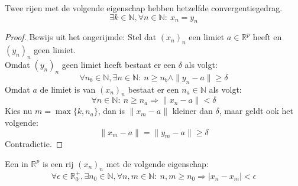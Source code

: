 \documentclass[main.tex]{subfiles}
\begin{document}
\begin{pr}
  Twee rijen met de volgende eigenschap hebben hetzelfde convergentiegedrag.
  \[ \exists k\in \mathbb{N}, \forall n \in \mathbb{N}:\ x_{n} = y_{n} \]

  \begin{proof}
    Bewijs uit het ongerijmde: Stel dat $(x_{n})_{n}$ een limiet $a\in\mathbb{R}^{p}$ heeft en $(y_{n})_{n}$ geen limiet.\\
    Omdat $(y_{n})_{n}$ geen limiet heeft bestaat er een $\delta$ als volgt:
    \[ \forall n_{b}\in \mathbb{N},\exists n\in \mathbb{N}:\ n \ge n_{b} \wedge\|y_{n}-a\| \ge \delta \]
    Omdat $a$ de limiet is van $(x_{n})_{n}$ bestaat er een $n_{a}\in \mathbb{N}$ als volgt:
    \[ \forall n\in \mathbb{N}:\ n\ge n_{a} \Rightarrow \|x_{n}-a\| <\delta \]
    Kies nu $m = \max\{k,n_{a}\}$, dan is $\|x_{m}-a\|$ kleiner dan $\delta$, maar geldt ook het volgende:
    \[ \|x_{m}-a\| = \|y_{m}-a\| \ge \delta \]
    Contradictie.
\feed
  \end{proof}
\end{pr}




\begin{de}
  Een  in $\mathbb{R}^{p}$ is een rij $(x_{n})_{n}$ met de volgende eigenschap:
  \[ \forall \epsilon \in \mathbb{R}_{0}^{+}, \exists n_{0}\in \mathbb{N}, \forall n,m \in \mathbb{N}:\ n,m \ge n_{0} \Rightarrow |x_{n}-x_{m}| < \epsilon \]
\end{de}

\end{document}
